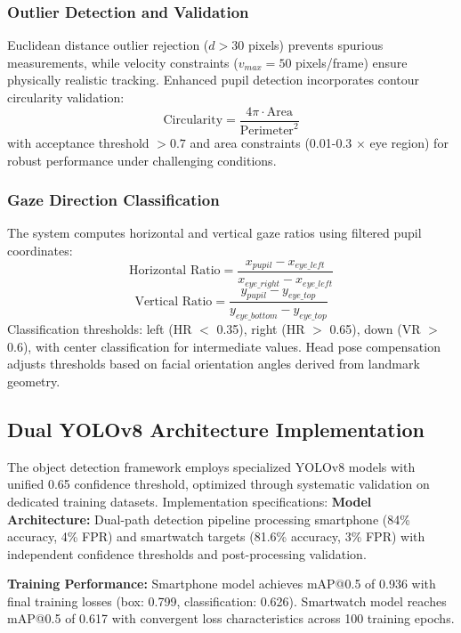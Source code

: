 \documentclass[conference]{IEEEtran}
\begin{document}
\subsubsection{Outlier Detection and Validation}
Euclidean distance outlier rejection ($d > 30$ pixels) prevents spurious measurements, while velocity constraints ($v_{max} = 50$ pixels/frame) ensure physically realistic tracking. Enhanced pupil detection incorporates contour circularity validation:
\begin{equation}
\text{Circularity} = \frac{4\pi \cdot \text{Area}}{\text{Perimeter}^2}
\end{equation}
with acceptance threshold $> 0.7$ and area constraints (0.01-0.3 × eye region) for robust performance under challenging conditions\cite{li2003survey}.
\subsubsection{Gaze Direction Classification}
The system computes horizontal and vertical gaze ratios using filtered pupil coordinates:
\begin{equation}
\text{Horizontal Ratio} = \frac{x_{pupil} - x_{eye\_left}}{x_{eye\_right} - x_{eye\_left}}
\end{equation}
\begin{equation}
\text{Vertical Ratio} = \frac{y_{pupil} - y_{eye\_top}}{y_{eye\_bottom} - y_{eye\_top}}
\end{equation}
Classification thresholds: left (HR $<$ 0.35), right (HR $>$ 0.65), down (VR $>$ 0.6), with center classification for intermediate values. Head pose compensation adjusts thresholds based on facial orientation angles derived from landmark geometry\cite{bar2001estimation}.
\subsection{Dual YOLOv8 Architecture Implementation}
The object detection framework employs specialized YOLOv8 models with unified 0.65 confidence threshold, optimized through systematic validation on dedicated training datasets. Implementation specifications:
\textbf{Model Architecture:} Dual-path detection pipeline processing smartphone (84\% accuracy, 4\% FPR) and smartwatch targets (81.6\% accuracy, 3\% FPR) with independent confidence thresholds and post-processing validation.

\textbf{Training Performance:} Smartphone model achieves mAP@0.5 of 0.936 with final training losses (box: 0.799, classification: 0.626). Smartwatch model reaches mAP@0.5 of 0.617 with convergent loss characteristics across 100 training epochs.
\end{document}
